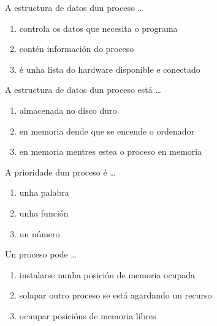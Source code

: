 \begin{diapo} \begin{frame}{ A estructura de datos dun proceso   \dots} 
\begin{enumerate}
	\item controla os datos que necesita o programa\pause
	\item contén información do proceso \pause
	\item é unha lista do hardware disponible e conectado 
\end{enumerate} \end{frame}  \end{diapo}  
\begin{diapo}\begin{frame}{ A estructura de datos dun proceso está  \dots}
\begin{enumerate}
	\item  almacenada no disco duro \pause
	\item  en memoria dende que se encende o ordenador \pause
	\item en memoria mentres estea o proceso en memoria 
\end{enumerate} \end{frame} \end{diapo}



\begin{diapo} \begin{frame}{ A prioridade dun proceso é   \dots} 
\begin{enumerate}
	\item unha palabra \pause
	\item unha función \pause
	\item un número 
\end{enumerate} \end{frame}  \end{diapo}  
\begin{diapo}\begin{frame}{ Un proceso pode   \dots}
\begin{enumerate}
	\item instalarse nunha posición de memoria ocupada\pause
	\item solapar outro proceso se está agardando un recurso \pause
	\item  ocuupar posicións de memoria libres
\end{enumerate} \end{frame} \end{diapo}

